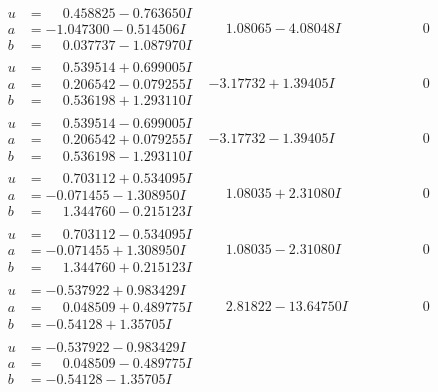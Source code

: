 \documentclass[1p]{elsarticle_modified}
\theoremstyle{definition}
\begin{document}
$$\begin{array}{c|c|c}
\begin{aligned}
u &= \phantom{-}0.458825 - 0.763650 I \\
a &= -1.047300 - 0.514506 I \\
b &= \phantom{-}0.037737 - 1.087970 I\end{aligned}
 & \phantom{-}1.08065 - 4.08048 I & \phantom{-0.000000 } 0 \\ \hline\begin{aligned}
u &= \phantom{-}0.539514 + 0.699005 I \\
a &= \phantom{-}0.206542 - 0.079255 I \\
b &= \phantom{-}0.536198 + 1.293110 I\end{aligned}
 & -3.17732 + 1.39405 I & \phantom{-0.000000 } 0 \\ \hline\begin{aligned}
u &= \phantom{-}0.539514 - 0.699005 I \\
a &= \phantom{-}0.206542 + 0.079255 I \\
b &= \phantom{-}0.536198 - 1.293110 I\end{aligned}
 & -3.17732 - 1.39405 I & \phantom{-0.000000 } 0 \\ \hline\begin{aligned}
u &= \phantom{-}0.703112 + 0.534095 I \\
a &= -0.071455 - 1.308950 I \\
b &= \phantom{-}1.344760 - 0.215123 I\end{aligned}
 & \phantom{-}1.08035 + 2.31080 I & \phantom{-0.000000 } 0 \\ \hline\begin{aligned}
u &= \phantom{-}0.703112 - 0.534095 I \\
a &= -0.071455 + 1.308950 I \\
b &= \phantom{-}1.344760 + 0.215123 I\end{aligned}
 & \phantom{-}1.08035 - 2.31080 I & \phantom{-0.000000 } 0 \\ \hline\begin{aligned}
u &= -0.537922 + 0.983429 I \\
a &= \phantom{-}0.048509 + 0.489775 I \\
b &= -0.54128 + 1.35705 I\end{aligned}
 & \phantom{-}2.81822 - 13.64750 I & \phantom{-0.000000 } 0 \\ \hline\begin{aligned}
u &= -0.537922 - 0.983429 I \\
a &= \phantom{-}0.048509 - 0.489775 I \\
b &= -0.54128 - 1.35705 I\end{aligned}

\end{array}$$
\end{document}
